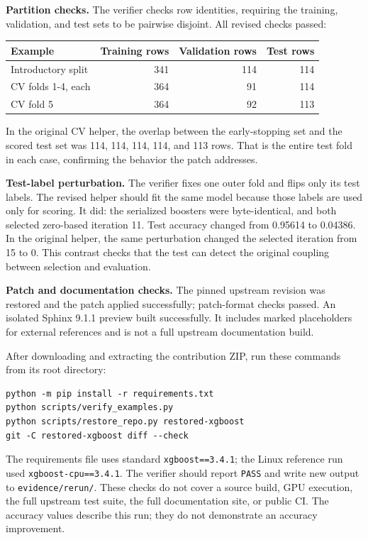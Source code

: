 \documentclass[10pt,letterpaper]{article}
\begin{document}
\textbf{Partition checks.} The verifier checks row identities, requiring
the training, validation, and test sets to be pairwise disjoint. All
revised checks passed:

\begin{longtable}[]{@{}lrrr@{}}
\toprule\noalign{}
Example & Training rows & Validation rows & Test rows \\
\midrule\noalign{}
\endhead
\bottomrule\noalign{}
\endlastfoot
Introductory split & 341 & 114 & 114 \\
CV folds 1-4, each & 364 & 91 & 114 \\
CV fold 5 & 364 & 92 & 113 \\
\end{longtable}

In the original CV helper, the overlap between the early-stopping set
and the scored test set was 114, 114, 114, 114, and 113 rows. That is
the entire test fold in each case, confirming the behavior the patch
addresses.

\textbf{Test-label perturbation.} The verifier fixes one outer fold and
flips only its test labels. The revised helper should fit the same model
because those labels are used only for scoring. It did: the serialized
boosters were byte-identical, and both selected zero-based iteration 11.
Test accuracy changed from 0.95614 to 0.04386. In the original helper,
the same perturbation changed the selected iteration from 15 to 0. This
contrast checks that the test can detect the original coupling between
selection and evaluation.

\textbf{Patch and documentation checks.} The pinned upstream revision
was restored and the patch applied successfully; patch-format checks
passed. An isolated Sphinx 9.1.1 preview built successfully. It includes
marked placeholders for external references and is not a full upstream
documentation build.

After downloading and extracting the contribution ZIP, run these
commands from its root directory:

\begin{verbatim}
python -m pip install -r requirements.txt
python scripts/verify_examples.py
python scripts/restore_repo.py restored-xgboost
git -C restored-xgboost diff --check
\end{verbatim}

The requirements file uses standard \texttt{xgboost==3.4.1}; the Linux
reference run used \texttt{xgboost-cpu==3.4.1}. The verifier should
report \texttt{PASS} and write new output to \texttt{evidence/rerun/}.
These checks do not cover a source build, GPU execution, the full
upstream test suite, the full documentation site, or public CI. The
accuracy values describe this run; they do not demonstrate an accuracy
improvement.
\end{document}
